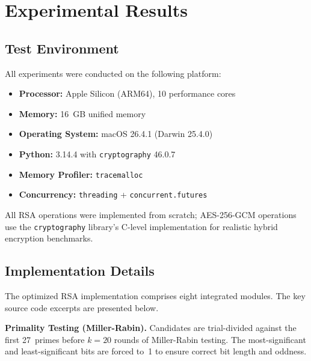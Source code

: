 \documentclass[journal]{IEEEtran}
\begin{document}
\section{Experimental Results}
\label{sec:results}

\subsection{Test Environment}

All experiments were conducted on the following platform:
\begin{itemize}
    \item \textbf{Processor:} Apple Silicon (ARM64), 10 performance cores
    \item \textbf{Memory:} 16~GB unified memory
    \item \textbf{Operating System:} macOS 26.4.1 (Darwin 25.4.0)
    \item \textbf{Python:} 3.14.4 with \texttt{cryptography} 46.0.7~\cite{cryptography_io}
    \item \textbf{Memory Profiler:} \texttt{tracemalloc}~\cite{python_tracemalloc}
    \item \textbf{Concurrency:} \texttt{threading} + \texttt{concurrent.futures}~\cite{python_threading}
\end{itemize}

All RSA operations were implemented from scratch; AES-256-GCM operations use the \texttt{cryptography} library's C-level implementation for realistic hybrid encryption benchmarks.

\newpage

\subsection{Implementation Details}

The optimized RSA implementation comprises eight integrated modules. The key source code excerpts are presented below.

\textbf{Primality Testing (Miller-Rabin).}
Candidates are trial-divided against the first 27~primes before $k=20$ rounds of Miller-Rabin testing. The most-significant and least-significant bits are forced to~1 to ensure correct bit length and oddness.
\end{document}
